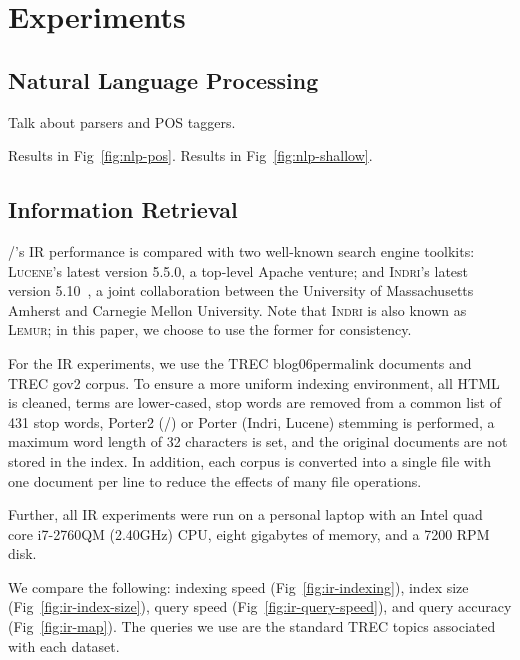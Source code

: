 \section{Experiments}

\subsection{Natural Language Processing}

Talk about parsers and POS taggers.

Results in Fig~\ref{fig:nlp-pos}.
Results in Fig~\ref{fig:nlp-shallow}.





\subsection{Information Retrieval}

\meta/'s IR performance is compared with two well-known search engine toolkits:
\textsc{Lucene}'s latest version 5.5.0\footnotemark[12], a top-level Apache
venture; and \textsc{Indri}'s latest version 5.10~\cite{lemur}, a joint
collaboration between the University of Massachusetts Amherst and Carnegie
Mellon University. Note that \textsc{Indri} is also known as \textsc{Lemur}; in
this paper, we choose to use the former for consistency.


For the IR experiments, we use the TREC blog06\footnotemark[7] permalink
documents and TREC gov2 corpus\footnotemark[8].
To ensure a more uniform indexing environment, all HTML is cleaned, terms are
lower-cased, stop words are removed from a common list of 431 stop words,
Porter2 (\meta/) or Porter (Indri, Lucene) stemming is performed, a maximum word
length of 32 characters is set, and the original documents are not stored in the
index. In addition, each corpus is converted into a single file with one
document per line to reduce the effects of many file operations.


Further, all IR experiments were run on a personal laptop with an Intel quad
core i7-2760QM (2.40GHz) CPU, eight gigabytes of memory, and a 7200 RPM disk.

We compare the following: indexing speed (Fig~\ref{fig:ir-indexing}), index size
(Fig~\ref{fig:ir-index-size}), query speed (Fig~\ref{fig:ir-query-speed}), and
query accuracy (Fig~\ref{fig:ir-map}). The queries we use are the standard TREC
topics associated with each dataset.

